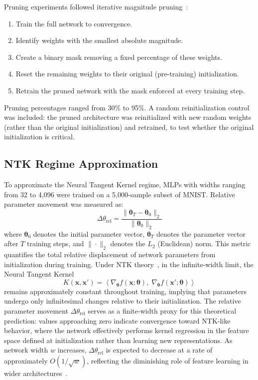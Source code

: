 \documentclass[conference]{IEEEtran}
\begin{document}
Pruning experiments followed iterative magnitude pruning~\cite{frankle2019lottery}:
\begin{enumerate}
    \item Train the full network to convergence.
    \item Identify weights with the smallest absolute magnitude.
    \item Create a binary mask removing a fixed percentage of these weights.
    \item Reset the remaining weights to their original (pre-training) initialization.
    \item Retrain the pruned network with the mask enforced at every training step.
\end{enumerate}
Pruning percentages ranged from 30\% to 95\%. A random reinitialization control was included: the pruned architecture was reinitialized with new random weights (rather than the original initialization) and retrained, to test whether the original initialization is critical.

\subsection{NTK Regime Approximation}

To approximate the Neural Tangent Kernel regime, MLPs with widths ranging from 32 to 4,096 were trained on a 5,000-sample subset of MNIST. Relative parameter movement was measured as:
\begin{equation}
    \Delta\theta_{\mathrm{rel}} = \frac{\|\boldsymbol{\theta}_T - \boldsymbol{\theta}_0\|_2}{\|\boldsymbol{\theta}_0\|_2}
    \label{eq:ntk_movement}
\end{equation}
where $\boldsymbol{\theta}_0$ denotes the initial parameter vector, $\boldsymbol{\theta}_T$ denotes the parameter vector after $T$ training steps, and $\|\cdot\|_2$ denotes the $L_2$ (Euclidean) norm. This metric quantifies the total relative displacement of network parameters from initialization during training. Under NTK theory~\cite{jacot2018neural}, in the infinite-width limit, the Neural Tangent Kernel
\begin{equation}
    K(\mathbf{x}, \mathbf{x}') = \left\langle \nabla_{\boldsymbol{\theta}} f(\mathbf{x}; \boldsymbol{\theta}),\; \nabla_{\boldsymbol{\theta}} f(\mathbf{x}'; \boldsymbol{\theta}) \right\rangle
    \label{eq:ntk_kernel}
\end{equation}
remains approximately constant throughout training, implying that parameters undergo only infinitesimal changes relative to their initialization. The relative parameter movement $\Delta\theta_{\mathrm{rel}}$ serves as a finite-width proxy for this theoretical prediction: values approaching zero indicate convergence toward NTK-like behavior, where the network effectively performs kernel regression in the feature space defined at initialization rather than learning new representations. As network width $w$ increases, $\Delta\theta_{\mathrm{rel}}$ is expected to decrease at a rate of approximately $O(1/\sqrt{w})$, reflecting the diminishing role of feature learning in wider architectures~\cite{allenzhu2019convergence}.
\end{document}
